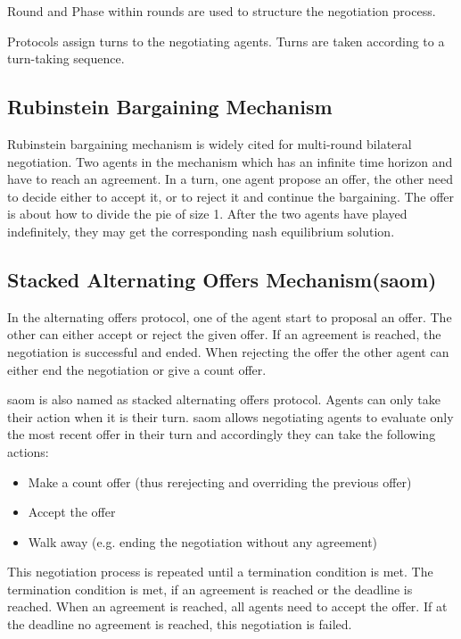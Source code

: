 \begin{definition}
Round and Phase within rounds are used to structure the negotiation process.
\end{definition}

\begin{definition}
Protocols assign turns to the negotiating agents. Turns are taken according to a turn-taking sequence.
\end{definition}

\subsection{Rubinstein Bargaining Mechanism}
Rubinstein bargaining mechanism is widely cited for multi-round bilateral negotiation.
Two agents in the mechanism which has an infinite time horizon and have to reach an agreement. In a turn, one agent propose an offer, the other need to decide either to accept it, or to reject it and continue the bargaining\parencite{Rubinstein1982}. The offer is about how to divide the pie of size 1. After the two agents have played indefinitely, they may get the corresponding nash equilibrium solution.

\subsection{Stacked Alternating Offers Mechanism(\gls{saom})} \label{background:saom}
In the alternating offers protocol, one of the agent start to proposal an offer. The other can either accept or reject the given offer. If an agreement is reached, the negotiation is successful and ended. When rejecting the offer the other agent can either end the negotiation or give a count offer.

\gls{saom} is also named as stacked alternating offers protocol. Agents can only take their action when it is their turn. \gls{saom} allows negotiating agents to evaluate only the most recent offer in their turn and accordingly they can take the following actions:
\begin{itemize}
\item Make a count offer (thus rerejecting and overriding the previous offer)
\item Accept the offer
\item Walk away (e.g. ending the negotiation without any agreement)
\end{itemize}
This negotiation process is repeated until a termination condition is met. The termination condition is met, if an agreement is reached or the deadline is reached. When an agreement is reached, all agents need to accept the offer. If at the deadline no agreement is reached, this negotiation is failed. 

